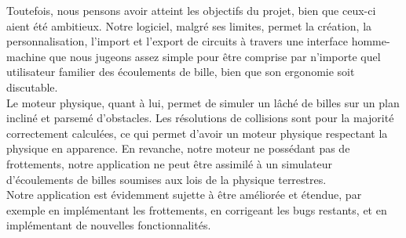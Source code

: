 \documentclass{report}
\begin{document}
Toutefois, nous pensons avoir atteint les objectifs du projet, bien que ceux-ci aient été ambitieux. Notre logiciel, malgré ses limites, permet la création, la personnalisation, l’import et l’export de circuits à travers une interface homme-machine que nous jugeons assez simple pour être comprise par n’importe quel utilisateur familier des écoulements de bille, bien que son ergonomie soit discutable. \\

Le moteur physique, quant à lui, permet de simuler un lâché de billes sur un plan incliné et parsemé d’obstacles. Les résolutions de collisions sont pour la majorité correctement calculées, ce qui permet d’avoir un moteur physique respectant la physique en apparence.
En revanche, notre moteur ne possédant pas de frottements, notre application ne peut être assimilé à un simulateur d’écoulements de billes soumises aux lois de la physique terrestres. \\

Notre application est évidemment sujette à être améliorée et étendue, par exemple en implémentant les frottements, en corrigeant les bugs restants, et en implémentant de nouvelles fonctionnalités.
\end{document}
